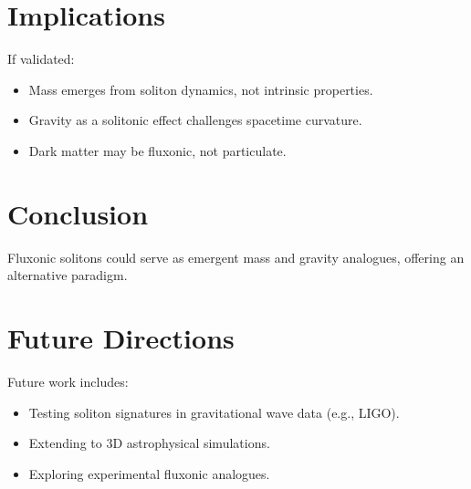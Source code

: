 \documentclass{article}
\begin{document}
\section{Implications}
If validated:
\begin{itemize}
    \item Mass emerges from soliton dynamics, not intrinsic properties.
    \item Gravity as a solitonic effect challenges spacetime curvature.
    \item Dark matter may be fluxonic, not particulate.
\end{itemize}

\section{Conclusion}
Fluxonic solitons could serve as emergent mass and gravity analogues, offering an alternative paradigm.

\section{Future Directions}
Future work includes:
\begin{itemize}
    \item Testing soliton signatures in gravitational wave data (e.g., LIGO).
    \item Extending to 3D astrophysical simulations.
    \item Exploring experimental fluxonic analogues.
\end{itemize}
\end{document}
